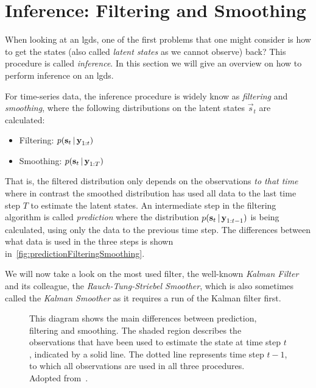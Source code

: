 \section{Inference: Filtering and Smoothing}
	\label{sec:filteringSmoothing}

	When looking at an \ac{lgds}, one of the first problems that one might consider is how to get the states (also called \emph{latent states} as we cannot observe) back? This procedure is called \emph{inference}. In this section we will give an overview on how to perform inference on an \ac{lgds}.

	For time-series data, the inference procedure is widely know as \emph{filtering} and \emph{smoothing}, where the following distributions on the latent states \( \vec{s}_t \) are calculated:
	\begin{itemize}
		\item Filtering: \tabto{2.5cm} \( p(\boldsymbol{\mathrm{s}}_t \,\vert\, \boldsymbol{\mathrm{y}}_{1:t}) \)
		\item Smoothing: \tabto{2.5cm} \( p(\boldsymbol{\mathrm{s}}_t \,\vert\, \boldsymbol{\mathrm{y}}_{1:T}) \)
	\end{itemize}
	That is, the filtered distribution only depends on the observations \emph{to that time} where in contrast the smoothed distribution has used all data to the last time step \(T\) to estimate the latent states. An intermediate step in the filtering algorithm is called \emph{prediction} where the distribution \( p(\boldsymbol{\mathrm{s}}_t \,\vert\, \boldsymbol{\mathrm{y}}_{1:t - 1}) \) is being calculated, using only the data to the previous time step. The differences between what data is used in the three steps is shown in~\autoref{fig:predictionFilteringSmoothing}.

	We will now take a look on the most used filter, the well-known \emph{Kalman Filter} and its colleague, the \emph{Rauch-Tung-Striebel Smoother}, which is also sometimes called the \emph{Kalman Smoother} as it requires a run of the Kalman filter first.

	\begin{figure}
		\centering
		\tikzPredictionFilteringSmoothing
		\caption[Illustration of the differences between prediction, filtering and smoothing]{This diagram shows the main differences between prediction, filtering and smoothing. The shaded region describes the observations that have been used to estimate the state at time step \(t\), indicated by a solid line. The dotted line represents time step \(t - 1\), to which all observations are used in all three procedures. \\ Adopted from~\cite{solinCubatureIntegrationMethods2010}.}
		\label{fig:predictionFilteringSmoothing}
	\end{figure}

